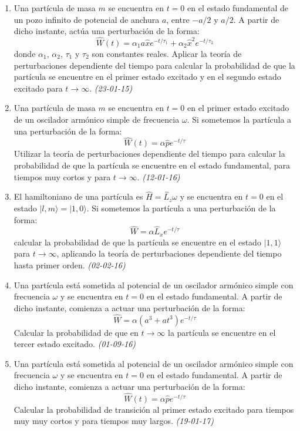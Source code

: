 \begin{enumerate}
    \item  Una partícula de masa \( m \) se encuentra en \( t = 0 \) en el estado fundamental de un pozo infinito de potencial de anchura \( a \), entre \( -a/2 \) y \( a/2 \). A partir de dicho instante, actúa una perturbación de la forma:
    \[
    \hat{W}(t) = \alpha_1 a \hat{x} e^{-t/\tau_1} + \alpha_2 \hat{x}^2 e^{-t/\tau_2}
    \]
    donde \( \alpha_1 \), \( \alpha_2 \), \( \tau_1 \) y \( \tau_2 \) son constantes reales. Aplicar la teoría de perturbaciones dependiente del tiempo para calcular la probabilidad de que la partícula se encuentre en el primer estado excitado y en el segundo estado excitado para \( t \to \infty \). \textit{(23-01-15)}

    \item Una partícula de masa \( m \) se encuentra en \( t = 0 \) en el primer estado excitado de un oscilador armónico simple de frecuencia \( \omega \). Si sometemos la partícula a una perturbación de la forma:
    \[
    \hat{W}(t) = \alpha \hat{p} e^{-t/\tau}
    \]
    Utilizar la teoría de perturbaciones dependiente del tiempo para calcular la probabilidad de que la partícula se encuentre en el estado fundamental, para tiempos muy cortos y para \( t \to \infty \). \textit{(12-01-16)}

    \item El hamiltoniano de una partícula es \( \hat{H} = \hat{L}_z \omega \) y se encuentra en \( t = 0 \) en el estado \( | l, m \rangle = | 1, 0 \rangle \). Si sometemos la partícula a una perturbación de la forma:
    \[
    \hat{W} = \alpha \hat{L}_x e^{-t/\tau}
    \]
    calcular la probabilidad de que la partícula se encuentre en el estado \( | 1, 1 \rangle \) para \( t \to \infty \), aplicando la teoría de perturbaciones dependiente del tiempo hasta primer orden. \textit{(02-02-16)}

    \item Una partícula está sometida al potencial de un oscilador armónico simple con frecuencia \( \omega \) y se encuentra en \( t = 0 \) en el estado fundamental. A partir de dicho instante, comienza a actuar una perturbación de la forma:
    \[
    \hat{W} = \alpha \left( a^3 + a t^3 \right) e^{-t/\tau}
    \]
    Calcular la probabilidad de que en \( t \to \infty \) la partícula se encuentre en el tercer estado excitado. \textit{(01-09-16)}

    \item Una partícula está sometida al potencial de un oscilador armónico simple con frecuencia \( \omega \) y se encuentra en \( t = 0 \) en el estado fundamental. A partir de dicho instante, comienza a actuar una perturbación de la forma:
    \[
    \hat{W}(t) = \alpha \hat{p} e^{-t/\tau}
    \]
    Calcular la probabilidad de transición al primer estado excitado para tiempos muy muy cortos y para tiempos muy largos. \textit{(19-01-17)}
    

\end{enumerate}
